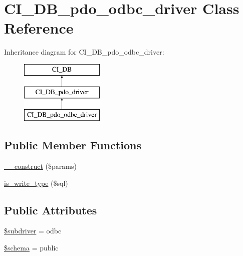 \hypertarget{class_c_i___d_b__pdo__odbc__driver}{}\section{C\+I\+\_\+\+D\+B\+\_\+pdo\+\_\+odbc\+\_\+driver Class Reference}
\label{class_c_i___d_b__pdo__odbc__driver}
Inheritance diagram for C\+I\+\_\+\+D\+B\+\_\+pdo\+\_\+odbc\+\_\+driver\+:\begin{figure}[H]
\begin{center}
\leavevmode
\includegraphics[height=3.000000cm]{class_c_i___d_b__pdo__odbc__driver}
\end{center}
\end{figure}
\subsection*{Public Member Functions}
\begin{DoxyCompactItemize}
\item 
\mbox{\hyperlink{class_c_i___d_b__pdo__odbc__driver_a9162320adff1a1a4afd7f2372f753a3e}{\+\_\+\+\_\+construct}} (\$params)
\item 
\mbox{\hyperlink{class_c_i___d_b__pdo__odbc__driver_af435df5703c238769d6d16fde6d51182}{is\+\_\+write\+\_\+type}} (\$sql)
\end{DoxyCompactItemize}
\subsection*{Public Attributes}
\begin{DoxyCompactItemize}
\item 
\mbox{\hyperlink{class_c_i___d_b__pdo__odbc__driver_a1322ca756348b11d080cb7a4f590de15}{\$subdriver}} = \textquotesingle{}odbc\textquotesingle{}
\item 
\mbox{\hyperlink{class_c_i___d_b__pdo__odbc__driver_a83022b1d70799d2bde3d64dca9cb40ee}{\$schema}} = \textquotesingle{}public\textquotesingle{}
\end{DoxyCompactItemize}
